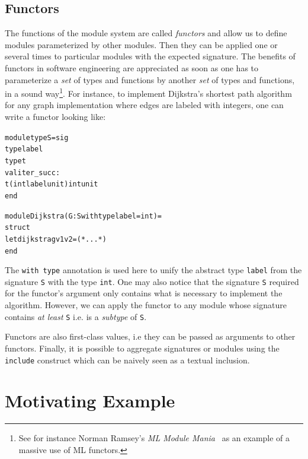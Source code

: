 \subsection{Functors}

The functions of the module system are called \emph{functors} and
allow us to define modules parameterized by other modules. Then they
can be applied one or several times to particular modules with the
expected signature. The benefits of functors in software engineering
are appreciated as soon as one has to parameterize a \emph{set} of
types and functions by another \emph{set} of types and functions, in a
sound way\footnote{See for instance Norman Ramsey's \emph{ML Module
    Mania}~\cite{XII:ramsey05} as an example of a massive use of ML
  functors.}. 
For instance, to implement Dijkstra's shortest path
algorithm for any graph implementation where edges are labeled with
integers, one can write a functor looking like:
\begin{alltt}
module type S = sig
  type label
  type t
  val iter_succ : 
    t \fl (int \fois label \fl unit) \fl int \fl unit
end

module Dijkstra (G : S with type label = int) = 
  struct
    let dijkstra g v1 v2 = (* ... *)
  end
\end{alltt}
The \texttt{with type} annotation is used here to unify the abstract
type \texttt{label} from the signature \texttt{S} with the type
\texttt{int}. One may also notice that the signature \texttt{S}
required for the functor's argument only contains what is necessary to
implement the algorithm. However, we can apply the functor to any
module whose signature contains \emph{at least} \texttt{S} i.e. is a
\emph{subtype} of \texttt{S}.

Functors are also first-class values, i.e they can be passed as
arguments to other functors. Finally, it is possible to aggregate
signatures or modules using the \texttt{include} construct which can
be naively seen as a textual inclusion.


\section{Motivating Example}\label{XII:motivatingexample}


